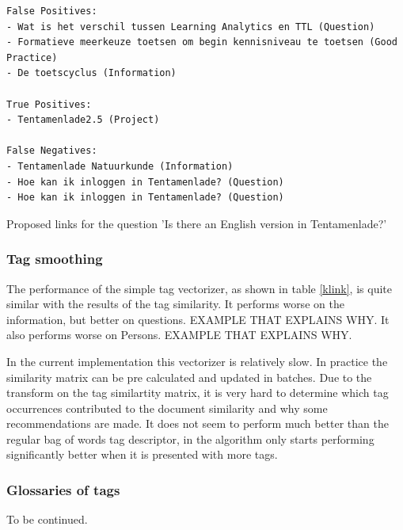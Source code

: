 \begin{table}
\begin{lstlisting}
False Positives:
- Wat is het verschil tussen Learning Analytics en TTL (Question)
- Formatieve meerkeuze toetsen om begin kennisniveau te toetsen (Good Practice)
- De toetscyclus (Information)

True Positives:
- Tentamenlade2.5 (Project)

False Negatives:
- Tentamenlade Natuurkunde (Information)
- Hoe kan ik inloggen in Tentamenlade? (Question)
- Hoe kan ik inloggen in Tentamenlade? (Question)
\end{lstlisting}
\caption{Proposed links for the question 'Is there an English version in Tentamenlade?'}
\label{proposed}
\end{table}

\subsubsection{Tag smoothing}
The performance of the simple tag vectorizer, as shown in table \ref{klink}, is quite similar with the results of the tag similarity. It performs worse on the information, but better on questions. EXAMPLE THAT EXPLAINS WHY. It also performs worse on Persons. EXAMPLE THAT EXPLAINS WHY. 

In the current implementation this vectorizer is relatively slow. In practice the similarity matrix can be pre calculated and updated in batches. Due to the transform on the tag similartity matrix, it is very hard to determine which tag occurrences contributed to the document similarity and why some recommendations are made. It does not seem to perform much better than the regular bag of words tag descriptor, in \citeauthor{zhou2011web} the algorithm only starts performing significantly better when it is presented with more tags.

\subsubsection{Glossaries of tags}
To be continued.

